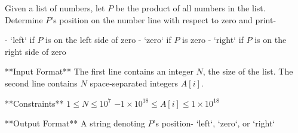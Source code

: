 Given a list of numbers, let $P$ be the product of all numbers in the list.  
Determine $P$'s position on the number line with respect to zero and print-

- `left` if $P$ is on the left side of zero
- `zero` if $P$ is zero
- `right` if $P$ is on the right side of zero

**Input Format**  
The first line contains an integer $N$, the size of the list.  
The second line contains $N$ space-separated integers $A[i]$.

**Constraints**  
$1 \leq N \leq 10^7$  
$-1 \times 10^{18} \leq A[i] \leq 1 \times 10^{18}$

**Output Format**  
A string denoting $P$'s position- `left`, `zero`, or `right`
